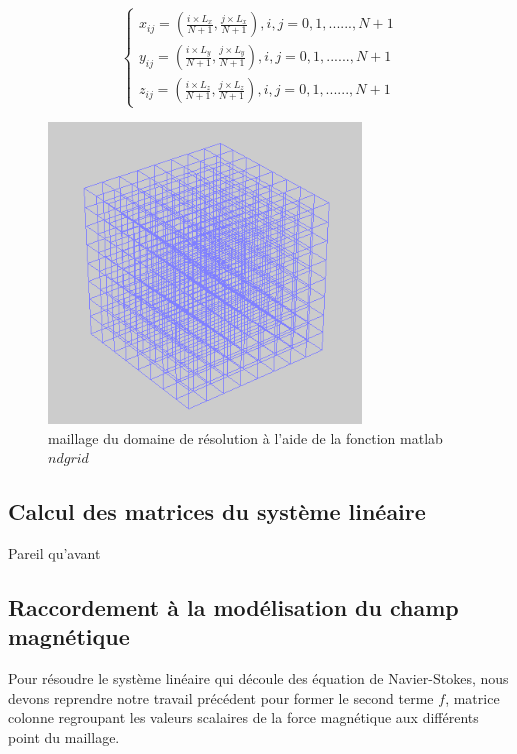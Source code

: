 \documentclass[a4paper,12pt,titlepage]{report}
\begin{document}
\begin{onehalfspace}
\[
\left\{
\begin{array}{ccc}
  x_{ij} = (\frac{i\times L_x}{N+1} ,\frac{j\times L_x}{N+1}),    i,j=0,1,......,N+1\\
  y_{ij} = (\frac{i\times L_y}{N+1} ,\frac{j\times L_y}{N+1}),    i,j=0,1,......,N+1  \\
 z_{ij} = (\frac{i\times L_z}{N+1} ,\frac{j\times L_z}{N+1}),    i,j=0,1,......,N+1  
\end{array}
\right.
\]
\begin{figure}[!h]
	\begin{center}
	\centering
		\includegraphics[height = 8cm, keepaspectratio]{graphes/maillage_droit.png} 
		\caption{maillage du domaine de résolution à l'aide de la fonction matlab $ndgrid$}
	\end{center}
\end{figure}

\newpage
\subsection{Calcul des matrices du système linéaire}

Pareil qu'avant


\subsection{Raccordement à la modélisation du champ magnétique}

Pour résoudre le système linéaire qui découle des équation de Navier-Stokes, nous devons reprendre notre travail précédent pour former le second terme $f$, matrice colonne regroupant les valeurs scalaires de la force magnétique aux différents point du maillage.


\end{onehalfspace}
\end{document}
